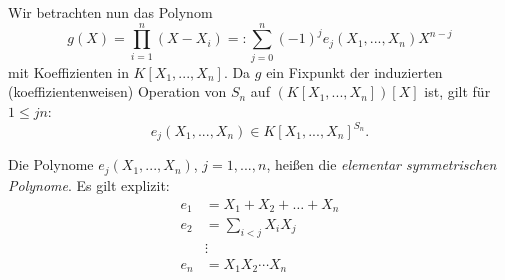 \documentclass{book}
\begin{document}
Wir betrachten nun das Polynom 
\begin{equation}
    \label{eq:elsym}
    g(X) = \prod_{i =1}^n (X-X_i) =: \sum_{j = 0}^n (-1)^j e_j(X_1, ..., X_n) X^{n-j}
\end{equation}
mit Koeffizienten in $K[X_1,...,X_n]$. Da $g$ ein Fixpunkt der induzierten
(koeffizientenweisen) Operation von $S_n$ auf $(K[X_1,...,X_n])[X]$ ist, gilt für
$1 \le j n$:
\[
    e_j(X_1,...,X_n) \in K[X_1, ..., X_n]^{S_n}.
\]

\begin{defi}
    \label{defi:elsym}
    Die Polynome $e_j(X_1, ..., X_n)$, $j = 1, ..., n$, heißen die {\em elementar symmetrischen Polynome}. Es gilt explizit:
    \begin{align*}
        e_1 & = X_1 + X_2 + \ldots + X_n \\
        e_2 & = \sum_{i<j} X_iX_j\\
            & \vdots \\
        e_n & = X_1 X_2 \cdots X_n
    \end{align*}
\end{defi}
\end{document}
